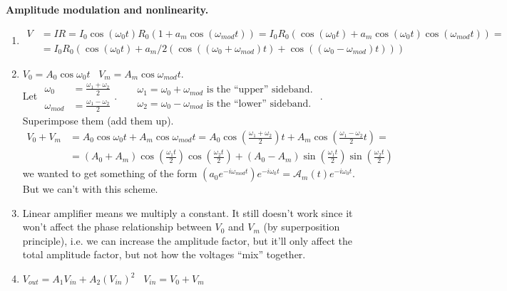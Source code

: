 \documentclass[twoside,10pt]{amsart}
\newcommand{\problemhead}[1]
  {\smallskip
   \noindent{\large\bf Problem #1.}
   \smallskip}
\begin{document}
\problemhead{6.27} \textbf{ Amplitude modulation and nonlinearity.}
\begin{enumerate}
\item 
\[
\begin{aligned}
  V & = IR = I_0 \cos{(\omega_0 t )} R_0 (1 + a_m \cos{ (\omega_{mod} t ) } ) = I_0 R_0 ( \cos{ (\omega_0 t) } + a_m \cos{ (\omega_0 t) } \cos{ (\omega_{mod} t) } ) = \\
  & = I_0 R_0 ( \cos{ (\omega_0 t)} + a_m/2 ( \cos{ ((\omega_0 + \omega_{mod} )t) } + \cos{ ((\omega_0 - \omega_{mod})t)  })   )
\end{aligned}
\]
\item $V_0 = A_0 \cos{ \omega_0 t}$ \quad \, $V_m = A_m \cos{ \omega_{mod} t}$.  \\
Let $\begin{aligned} \omega_0 & = \frac{ \omega_1 + \omega_2}{2} \\ \omega_{mod} & = \frac{ \omega_1 - \omega_2}{2} \end{aligned}$. \quad \,  $\begin{aligned} & \omega_1 = \omega_0 + \omega_{mod} \text{ is the ``upper'' sideband. } \\ & \omega_2 = \omega_0 - \omega_{mod} \text{ is the ``lower'' sideband. } \end{aligned}$.  \\
Superimpose them (add them up).  
\[
\begin{aligned}
  V_0 + V_m & = A_0 \cos{ \omega_0 t} + A_m \cos{ \omega_{mod} t } = A_0 \cos{ \left( \frac{ \omega_1 + \omega_2 }{2} \right) t } + A_m \cos{ \left( \frac{ \omega_1 - \omega_2}{2} t \right) } = \\ 
  & = (A_0 + A_m) \cos{ \left( \frac{ \omega_1 t }{2} \right) } \cos{ \left( \frac{ \omega_2 t}{2} \right) } + (A_0 - A_m) \sin{ \left( \frac{ \omega_1 t}{2} \right) } \sin{\left( \frac{ \omega_2 t}{2} \right) }
\end{aligned}
\]
we wanted to get something of the form $(a_0 e^{-i\omega_{mod} t})e^{-i\omega_0 t} = \mathcal{A}_m(t) e^{-i\omega_0 t}$.  But we can't with this scheme.  
\item Linear amplifier means we multiply a constant.  It still doesn't work since it won't affect the phase relationship between $V_0$ and $V_m$ (by superposition principle), i.e. we can increase the amplitude factor, but it'll only affect the total amplitude factor, but not how the voltages ``mix'' together.  
\item $V_{out} = A_1 V_{in} + A_2 (V_{in})^2$ \quad \quad \, $V_{in} = V_0 + V_m$ \\

\end{enumerate}
\end{document}

